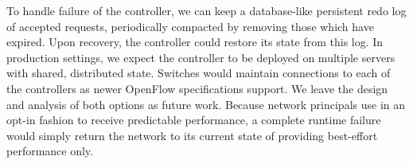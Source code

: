 To handle failure of the controller, we can keep a database-like
persistent redo log of accepted requests, periodically compacted
by removing those which have expired. Upon recovery, the
\sys controller could restore its state from this log.  In production
settings, we expect the \sys controller to be deployed on multiple
servers with shared, distributed state. Switches would maintain
connections to each of the controllers as newer OpenFlow
specifications support. We leave the design and analysis of both
options as future work.  Because network principals use \sys in an
opt-in fashion to receive predictable performance, a complete
runtime failure would simply return the network to its current state
of providing best-effort performance only.
